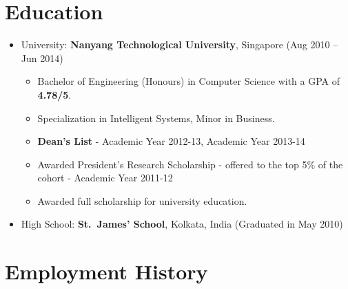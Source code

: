 
\section{Education}\label{education}

\begin{itemize}
\tightlist
\item
  University: \textbf{Nanyang Technological University}, Singapore
  \hfill (Aug 2010 -- Jun 2014)

  \begin{itemize}
  \tightlist
  \item
    Bachelor of Engineering (Honours) in Computer Science with a GPA of
    \textbf{4.78/5}.
  \item
    Specialization in Intelligent Systems, Minor in Business.
  \item
    \textbf{Dean's List} - Academic Year 2012-13, Academic Year 2013-14
  \item
    Awarded President's Research Scholarship - offered to the top 5\% of
    the cohort - Academic Year 2011-12
  \item
    Awarded full scholarship for university education.
  \end{itemize}
\item
  High School: \textbf{St.~James' School}, Kolkata, India
  \hfill (Graduated in May 2010)
\end{itemize}

\section{Employment History}\label{employment-history}

